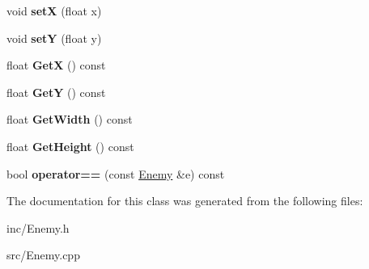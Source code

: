 \begin{DoxyCompactItemize}
void {\bfseries setX} (float x)
\item 
\mbox{\label{class_enemy_ac322e22ca37f7a7df4c6df7349179962}} 
void {\bfseries setY} (float y)
\item 
\mbox{\label{class_enemy_ad3e3c7ba258e1dc243912a8441269796}} 
float {\bfseries GetX} () const
\item 
\mbox{\label{class_enemy_ad784c67584391699a96c1ab89c63312c}} 
float {\bfseries GetY} () const
\item 
\mbox{\label{class_enemy_a3e82c71725968b2c74d4196b0c1c8655}} 
float {\bfseries Get\+Width} () const
\item 
\mbox{\label{class_enemy_a46046a4a3b4b2c079efefcd7b6f914a2}} 
float {\bfseries Get\+Height} () const
\item 
\mbox{\label{class_enemy_a79e35ffda1a608b2f04f0065710c3e88}} 
bool {\bfseries operator==} (const \hyperlink{class_enemy}{Enemy} \&e) const
\end{DoxyCompactItemize}


The documentation for this class was generated from the following files\+:\begin{DoxyCompactItemize}
\item 
inc/Enemy.\+h\item 
src/Enemy.\+cpp\end{DoxyCompactItemize}
